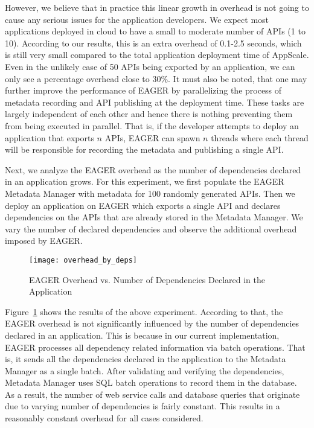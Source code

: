 However, we believe that in practice this linear growth in overhead is not going to cause any serious issues for the application developers.
We expect most applications deployed in cloud to have a small to moderate number of APIs (1 to 10). According to our results, this is an 
extra overhead of 0.1-2.5 seconds, which is still very small compared to the total application deployment time of AppScale. Even in the
unlikely case of 50 APIs being exported by an application, we can only see a percentage overhead close to 30\%. It must also be noted, that
one may further improve the performance of EAGER by parallelizing the process of metadata recording and API publishing at the deployment
time. These tasks are largely independent of each other and hence there is nothing preventing them from being executed in parallel. That is,
if the developer attempts to deploy an application that exports $n$ APIs, EAGER can spawn $n$ threads where each thread will be responsible
for recording the metadata and publishing a single API.

Next, we analyze the EAGER overhead as the number of dependencies declared in an application grows. For this experiment, we first populate 
the EAGER Metadata Manager with metadata for 100 randomly generated APIs. Then we deploy an application on EAGER which exports a single
API and declares dependencies on the APIs that are already stored in the Metadata Manager. We vary the number of declared dependencies and
observe the additional overhead imposed by EAGER.

\begin{figure}
\centering
\texttt{[image: overhead\_by\_deps]}
\caption{EAGER Overhead vs. Number of Dependencies Declared in the Application}
\label{fig:overhead_by_deps}
\end{figure}

Figure~\ref{fig:overhead_by_deps} shows the results of the above experiment. According to that, the EAGER overhead is not significantly
influenced by the number of dependencies declared in an application. This is because in our current implementation, EAGER processes
all dependency related information via batch operations. That is, it sends all the dependencies declared in the application to the Metadata
Manager as a single batch. After validating and verifying the dependencies, Metadata Manager uses SQL batch operations to record
them in the database. As a result, the number of web service calls and database queries that originate due to varying number of dependencies
is fairly constant. This results in a reasonably constant overhead for all cases considered.

